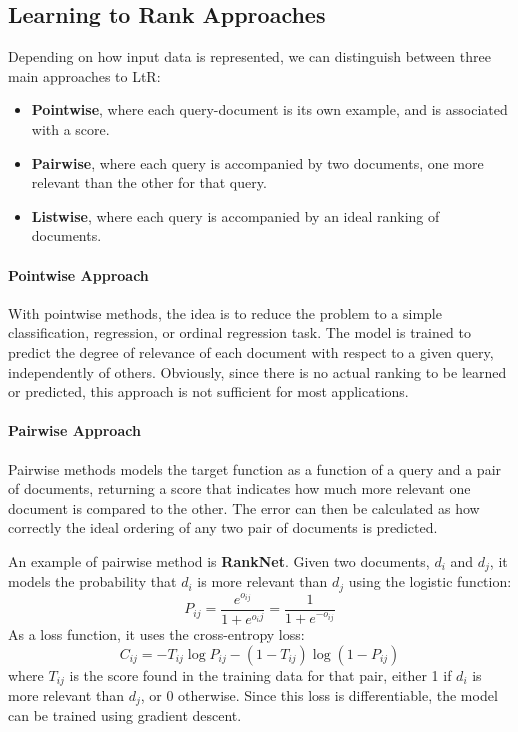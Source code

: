 \subsection{Learning to Rank Approaches}

Depending on how input data is represented, we can distinguish between three main approaches to LtR:
\begin{itemize}
    \item \textbf{Pointwise}, where each query-document is its own example, and is associated with a score.
    \item \textbf{Pairwise}, where each query is accompanied by two documents, one more relevant than the other for that query.
    \item \textbf{Listwise}, where each query is accompanied by an ideal ranking of documents.
\end{itemize}

\paragraph{Pointwise Approach}
With pointwise methods, the idea is to reduce the problem to a simple classification,  regression, or ordinal regression task. The model is trained to predict the degree of relevance of each document with respect to a given query, independently of others. Obviously, since there is no actual ranking to be learned or predicted, this approach is not sufficient for most applications.

\paragraph{Pairwise Approach}
Pairwise methods models the target function as a function of a query and a pair of documents, returning a score that indicates how much more relevant one document is compared to the other. The error can then be calculated as how correctly the ideal ordering of any two pair of documents is predicted.

An example of pairwise method is \textbf{RankNet}. Given two documents, $d_i$ and $d_j$, it models the probability that $d_i$ is more relevant than $d_j$ using the logistic function:
\begin{equation*}
    P_{ij} = \frac{e^{o_{ij}}}{1 + e^{o_ij}} = \frac{1}{1 + e^{-o_{ij}}}
\end{equation*}
As a loss function, it uses the cross-entropy loss:
\begin{equation*}
    C_{ij} = - T_{ij} \log P_{ij} - (1 - T_{ij}) \log (1 - P_{ij})
\end{equation*}
where $T_{ij}$ is the score found in the training data for that pair, either 1 if $d_i$ is more relevant than $d_j$, or 0 otherwise. Since this loss is differentiable, the model can be trained using gradient descent.

